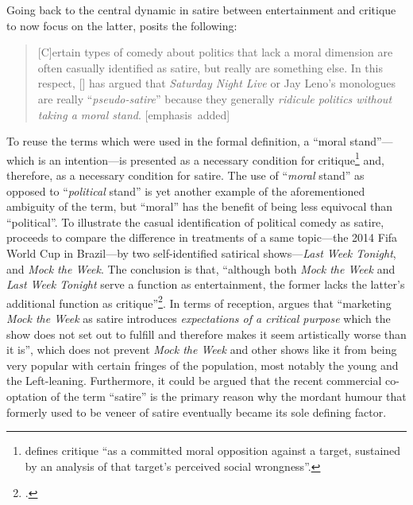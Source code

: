 \documentclass[
,a4paper
,DIV=12
,12pt
,abstract
,bibliography=totoc
]{scrartcl}
\begin{document}
Going back to the central dynamic in satire between entertainment and critique to now focus on the latter, \textcite[321]{declercq2018} posits the following:

\begin{quote}
  [C]ertain types of comedy about politics that lack a moral dimension are often casually identified as satire, but really are something else. In this respect, [\textcite[23--26]{peterson2008}] has argued that \emph{Saturday Night Live} or Jay Leno’s monologues are really \enquote{\emph{pseudo-satire}} because they generally \emph{ridicule politics without taking a moral stand}.  [emphasis~added]
\end{quote}
To reuse the terms which were used in the formal definition, a \enquote{moral stand}---which is an intention---is presented as a necessary condition for critique\footnote{\textcite[323]{declercq2018} defines critique \enquote{as a committed moral opposition against a target, sustained by an analysis of that target’s perceived social wrongness}.} and, therefore, as a necessary condition for satire.  The use of \enquote{\emph{moral} stand} as opposed to \enquote{\emph{political} stand} is yet another example of the aforementioned ambiguity of the term, but \enquote{moral} has the benefit of being less equivocal than \enquote{political}.  To illustrate the casual identification of political comedy as satire, \textcite[321-322]{declercq2018} proceeds to compare the difference in treatments of a same topic---the 2014 Fifa World Cup in Brazil---by two self-identified satirical shows---\emph{Last Week Tonight}, and \emph{Mock the Week}.  The conclusion is that, \enquote{although both \emph{Mock the Week} and \emph{Last Week Tonight} serve a function as entertainment, the former lacks the latter’s additional function as critique}\footnote{\Cite[322]{declercq2018}.}.  In terms of reception, \textcite[322]{declercq2018} argues that \enquote{marketing \emph{Mock the Week} as satire introduces \emph{expectations of a critical purpose} which the show does not set out to fulfill and therefore makes it seem artistically worse than it is}, which does not prevent \emph{Mock the Week} and other shows like it from being very popular with certain fringes of the population, most notably the young and the Left-leaning.  Furthermore, it could be argued that the recent commercial co-optation of the term \enquote{satire} is the primary reason why the mordant humour that formerly used to be veneer of satire eventually became its sole defining factor.  
\end{document}
